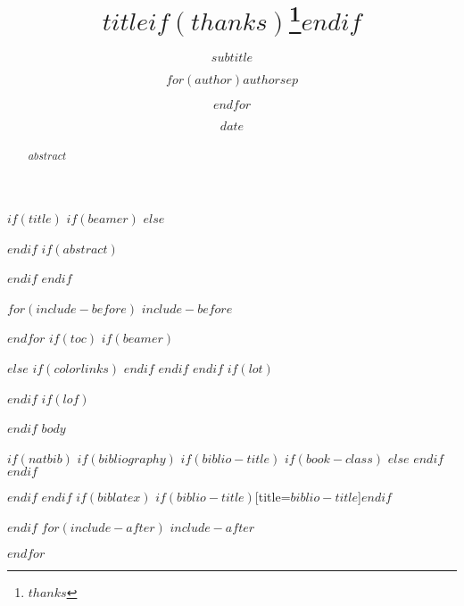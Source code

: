 \documentclass[$if(fontsize)$$fontsize$,$endif$$if(lang)$$babel-lang$,$endif$$if(papersize)$$papersize$paper,$endif$$if(beamer)$ignorenonframetext,$if(handout)$handout,$endif$$if(aspectratio)$aspectratio=$aspectratio$,$endif$$endif$$for(classoption)$$classoption$$sep$,$endfor$]{$documentclass$}
\title{$title$$if(thanks)$\thanks{$thanks$}$endif$}
\subtitle{$subtitle$}
\author{$for(author)$$author$$sep$ \and $endfor$}
\institute{$for(institute)$$institute$$sep$ \and $endfor$}
\date{$date$}
\begin{document}
$if(title)$
$if(beamer)$
\frame{\titlepage}
$else$
\maketitle
$endif$
$if(abstract)$
\begin{abstract}
$abstract$
\end{abstract}
$endif$
$endif$

$for(include-before)$
$include-before$

$endfor$
$if(toc)$
$if(beamer)$
\begin{frame}
\tableofcontents[hideallsubsections]
\end{frame}
$else$
{
$if(colorlinks)$
\hypersetup{linkcolor=$if(toccolor)$$toccolor$$else$$endif$}
$endif$
\setcounter{tocdepth}{$toc-depth$}
\tableofcontents
}
$endif$
$endif$
$if(lot)$
\listoftables
$endif$
$if(lof)$
\listoffigures
$endif$
$body$

$if(natbib)$
$if(bibliography)$
$if(biblio-title)$
$if(book-class)$
\renewcommand\bibname{$biblio-title$}
$else$
\renewcommand\refname{$biblio-title$}
$endif$
$endif$

$endif$
$endif$
$if(biblatex)$
\printbibliography$if(biblio-title)$[title=$biblio-title$]$endif$

$endif$
$for(include-after)$
$include-after$

$endfor$
\end{document}
